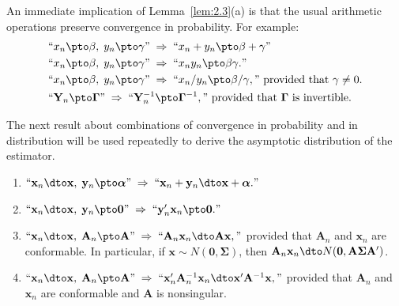 An immediate implication of Lemma~\ref{lem:2.3}(a) is that the usual arithmetic
operations preserve convergence in probability.  For example:
\begin{align*}
  &\text{``}x_n \pto \beta,\; y_n \pto \gamma\text{''} \;\Rightarrow\;
   \text{``}x_n + y_n \pto \beta + \gamma\text{''} \\
  &\text{``}x_n \pto \beta,\; y_n \pto \gamma\text{''} \;\Rightarrow\;
   \text{``}x_n y_n \pto \beta\gamma.\text{''} \\
  &\text{``}x_n \pto \beta,\; y_n \pto \gamma\text{''} \;\Rightarrow\;
   \text{``}x_n/y_n \pto \beta/\gamma,\text{''  provided that } \gamma \neq 0. \\
  &\text{``}\mathbf{Y}_n \pto \bm{\Gamma}\text{''} \;\Rightarrow\;
   \text{``}\mathbf{Y}_n^{-1} \pto \bm{\Gamma}^{-1},\text{'' provided that
   $\bm{\Gamma}$ is invertible.}
\end{align*}

The next result about combinations of convergence in probability and in
distribution will be used repeatedly to derive the asymptotic distribution of the
estimator.

\begin{lemma}
\label{lem:2.4}
\begin{enumerate}[label=(\alph*)]
  \item $\text{``}\mathbf{x}_n \dto \mathbf{x},\;
         \mathbf{y}_n \pto \bm{\alpha}\text{''} \;\Rightarrow\;
         \text{``}\mathbf{x}_n + \mathbf{y}_n \dto \mathbf{x} + \bm{\alpha}.\text{''}$
  \item $\text{``}\mathbf{x}_n \dto \mathbf{x},\;
         \mathbf{y}_n \pto \mathbf{0}\text{''} \;\Rightarrow\;
         \text{``}\mathbf{y}_n'\mathbf{x}_n \pto \mathbf{0}.\text{''}$
  \item $\text{``}\mathbf{x}_n \dto \mathbf{x},\;
         \mathbf{A}_n \pto \mathbf{A}\text{''} \;\Rightarrow\;
         \text{``}\mathbf{A}_n\mathbf{x}_n \dto \mathbf{A}\mathbf{x},\text{''}$
         provided that $\mathbf{A}_n$ and $\mathbf{x}_n$ are conformable.
         In particular, if\/ $\mathbf{x} \sim N(\mathbf{0}, \bm{\Sigma})$, then
         $\mathbf{A}_n\mathbf{x}_n \dto N(\mathbf{0},
         \mathbf{A}\bm{\Sigma}\mathbf{A}')$.
  \item $\text{``}\mathbf{x}_n \dto \mathbf{x},\;
         \mathbf{A}_n \pto \mathbf{A}\text{''} \;\Rightarrow\;
         \text{``}\mathbf{x}_n'\mathbf{A}_n^{-1}\mathbf{x}_n \dto
         \mathbf{x}'\mathbf{A}^{-1}\mathbf{x},\text{''}$
         provided that $\mathbf{A}_n$ and $\mathbf{x}_n$ are conformable and
         $\mathbf{A}$ is nonsingular.
\end{enumerate}
\end{lemma}

